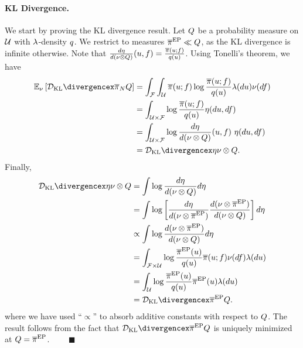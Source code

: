 \documentclass[12pt]{article}
\begin{document}
\paragraph{KL Divergence.} We start by proving the KL divergence result.
Let $\qMeas$ be a probability measure on $\parSpace$ with 
$\refMeas$-density $\qDens$. We restrict to measures 
$\postApproxEP[] \ll \qMeas$, as the KL divergence is infinite otherwise. 
Note that 
$\frac{d\emJoint}{d(\emDist[] \otimes \qMeas)}(\Par, \targetTraj) = \frac{\postDensNorm(\Par; \targetTraj)}{\qDens(\Par)}$.
Using Tonelli's theorem, we have 
\begin{align*}
\E_{\emDist[]}\left[\KL{\postNormEm}{\qMeas} \right]
&= \int_{\emSpace} \int_{\parSpace} 
\postDensNorm(\Par; \targetTraj) \log \frac{\postDensNorm(\Par; \targetTraj)}{\qDens(\Par)}
\refMeas(d\Par) \emDist[](d\targetTraj) \\
&= \int_{\parSpace \times \emSpace}  \log \frac{\postDensNorm(\Par; \targetTraj)}{\qDens(\Par)}
\emJoint(d\Par, d\targetTraj) \\
&= \int_{\parSpace \times \emSpace}  \log \frac{d\emJoint}{d(\emDist[] \otimes \qMeas)}(\Par, \targetTraj)
\ \emJoint(d\Par, d\targetTraj) \\
&= \KL{\emJoint}{\emDist[] \otimes \qMeas}.
\end{align*}
Finally, 
\begin{align*}
\KL{\emJoint}{\emDist[] \otimes \qMeas}
&= \int \log \frac{d\emJoint}{d(\emDist[] \otimes \qMeas)} d\emJoint \\
&= \int \log \left[\frac{d\emJoint}{d(\emDist[] \otimes \postApproxEP[])} \frac{d(\emDist[] \otimes \postApproxEP[])}{d(\emDist[] \otimes \qMeas)}\right] d\emJoint \\
&\propto \int \log \frac{d(\emDist[] \otimes \postApproxEP[])}{d(\emDist[] \otimes \qMeas)} d\emJoint \\
&= \int_{\emSpace \times \parSpace} 
\log \frac{\postApproxEP[](\Par)}{\qDens(\Par)} \postDensNorm(\Par; \targetTraj) \emDist[](d\targetTraj) \refMeas(d\Par) \\
&= \int_{\parSpace} \log \frac{\postApproxEP[](\Par)}{\qDens(\Par)} 
 \postApproxEP[](\Par) \refMeas(d\Par) \\
&= \KL{\postApproxEP[]}{\qMeas}.
\end{align*} 
where we have used ``$\propto$'' to absorb additive constants with respect to $\qMeas$. The result follows 
from the fact that $\KL{\postApproxEP[]}{\qMeas}$ is uniquely minimized at $\qMeas = \postApproxEP[]$. $\qquad \blacksquare$
\end{document}
